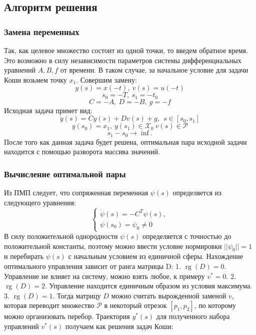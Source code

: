 \documentclass[11pt]{article}
\begin{document}
	{\subsection{Алгоритм решения}}
	{\subsubsection{Замена переменных}}
	{Так, как целевое множество состоит из одной точки, то введем обратное время. Это возможно в силу независимости параметров системы дифференциальных уравнений $A,B,f$ от времени. В таком случае, за начальное условие для задачи Коши возьмем точку $x_1$. Совершим замену:}
	\[y(s) = x(-t), \ v(s) =u(-t ) \]
	\[s_0 = -T, \ s_1 = -t_0 \]
	\[C = -A, \ D=-B, \ g=-f \]
	{Исходная задача примет вид:}
	\[\dot y(s) = Cy(s) +Dv(s) + g, \ \ s \in [s_0, s_1] \]
	\[ y(s_0) = x_1, \ y(s_1) \in \mathcal{X}_0 \ v(s) \in \mathcal{P} \]
	\[ s_1 - s_0 \rightarrow \inf. \]
	{После того как данная задача будет решена, оптимальная пара исходной задачи находится с помощью разворота массива значений.}
	{\subsubsection{Вычисление оптимальной пары}}
	{Из ПМП следует, что сопряженная переменная $\psi(s)$ определяется из следующего уравнения:}
	\[\begin{cases}
	 \dot \psi(s) = -C^{T}\psi(s),\\
	 \psi(s_0) = \psi_0 \neq 0 
	\end{cases} \]
	{В силу положительной однородности $\psi(s)$ определяется с точностью до положительной константы, поэтому можно ввести условие нормировки $||\psi_0|| = 1$ и перебирать $\psi(s)$ с начальным условием из единичной сферы.}
	\newline
	{Нахождение оптимального управления зависит от ранга матрицы D:}
	\newline
	{1. $\operatorname{rg}(D) = 0.$ Управление не влияет на систему, можно взять любое, к примеру $v^* = 0.$} 
	\newline
	{2. $\operatorname{rg}(D) = 2.$ Управление находится единичным образом из условия максимума.}
	\newline
	{3. $\operatorname{rg}(D) = 1.$ Тогда матрицу $D$ можно считать вырожденной заменой $v$, которая переводит множество $\mathcal{P}$ в некоторый отрезок $[p_1,p_2]$, по которому можно организовать перебор.}
	\newline
	{Траектория $y^*(s)$ для полученного набора управлений $v^*(s)$ получаем как решения задач Коши:}
\end{document}
